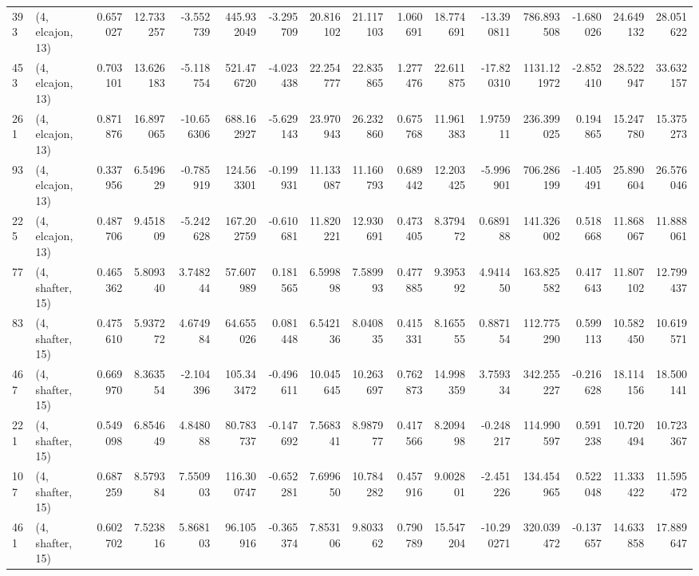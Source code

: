 \begin{tabular}{llrrrrrrrrrrrrrr}
393 &  (4, elcajon, 13) &   0.657027 &  12.733257 &  -3.552739 &   445.932049 &  -3.295709 &  20.816102 &  21.117103 &  1.060691 &  18.774691 & -13.390811 &   786.893508 & -1.680026 &  24.649132 &  28.051622 \\
453 &  (4, elcajon, 13) &   0.703101 &  13.626183 &  -5.118754 &   521.476720 &  -4.023438 &  22.254777 &  22.835865 &  1.277476 &  22.611875 & -17.820310 &  1131.121972 & -2.852410 &  28.522947 &  33.632157 \\
261 &  (4, elcajon, 13) &   0.871876 &  16.897065 & -10.656306 &   688.162927 &  -5.629143 &  23.970943 &  26.232860 &  0.675768 &  11.961383 &   1.975911 &   236.399025 &  0.194865 &  15.247780 &  15.375273 \\
93  &  (4, elcajon, 13) &   0.337956 &   6.549629 &  -0.785919 &   124.563301 &  -0.199931 &  11.133087 &  11.160793 &  0.689442 &  12.203425 &  -5.996901 &   706.286199 & -1.405491 &  25.890604 &  26.576046 \\
225 &  (4, elcajon, 13) &   0.487706 &   9.451809 &  -5.242628 &   167.202759 &  -0.610681 &  11.820221 &  12.930691 &  0.473405 &   8.379472 &   0.689188 &   141.326002 &  0.518668 &  11.868067 &  11.888061 \\
77  &  (4, shafter, 15) &   0.465362 &   5.809340 &   3.748244 &    57.607989 &   0.181565 &   6.599898 &   7.589993 &  0.477885 &   9.395392 &   4.941450 &   163.825582 &  0.417643 &  11.807102 &  12.799437 \\
83  &  (4, shafter, 15) &   0.475610 &   5.937272 &   4.674984 &    64.655026 &   0.081448 &   6.542136 &   8.040835 &  0.415331 &   8.165555 &   0.887154 &   112.775290 &  0.599113 &  10.582450 &  10.619571 \\
467 &  (4, shafter, 15) &   0.669970 &   8.363554 &  -2.104396 &   105.343472 &  -0.496611 &  10.045645 &  10.263697 &  0.762873 &  14.998359 &   3.759334 &   342.255227 & -0.216628 &  18.114156 &  18.500141 \\
221 &  (4, shafter, 15) &   0.549098 &   6.854649 &   4.848088 &    80.783737 &  -0.147692 &   7.568341 &   8.987977 &  0.417566 &   8.209498 &  -0.248217 &   114.990597 &  0.591238 &  10.720494 &  10.723367 \\
107 &  (4, shafter, 15) &   0.687259 &   8.579384 &   7.550903 &   116.300747 &  -0.652281 &   7.699650 &  10.784282 &  0.457916 &   9.002801 &  -2.451226 &   134.454965 &  0.522048 &  11.333422 &  11.595472 \\
461 &  (4, shafter, 15) &   0.602702 &   7.523816 &   5.868103 &    96.105916 &  -0.365374 &   7.853106 &   9.803362 &  0.790789 &  15.547204 & -10.290271 &   320.039472 & -0.137657 &  14.633858 &  17.889647 \\

\end{tabular}
